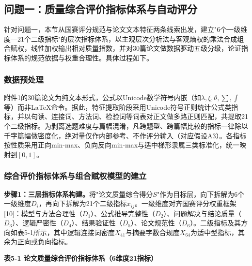 \documentclass[withoutpreface]{cumcmthesis}
\begin{document}
\subsection{问题一：质量综合评价指标体系与自动评分}
针对问题一，本节从国赛评分规范与论文文本特征两条线索出发，建立"6个一级维度—21个二级指标"的层次指标体系，以主观层次分析法与客观熵权的乘法合成组合赋权，线性加权输出相对质量指数，并对30篇论文做数据驱动五级分级，论证指标体系的规范依据与权重合理性。具体过程如下。

\subsubsection{数据预处理}
附件1的30篇论文为纯文本形式，公式以Unicode数学符号内嵌（如$\lambda,\xi,\theta,\sum,\int$等）而非LaTeX命令。据此，特征提取阶段采用Unicode符号正则统计公式类指标，并以句读、连接词、方法词、检验词等词表对正文做多路正则匹配，共提取21个二级指标。为剥离选题难度与篇幅混淆，凡跨题型、跨篇幅比较的指标一律除以千字篇幅做密度化，绝对量仅作内部参考、不作评分输入（对应假设A3）。各指标按性质采用正向min-max、负向反向min-max与适中梯形隶属三类标准化，统一映射到$[0,1]$。

\subsubsection{综合评价指标体系与组合赋权模型的建立}
\textbf{步骤1：三层指标体系构建。}将"论文质量综合得分$S$"作为目标层，向下拆解为6个一级维度$D_i$，再向下拆解为21个二级指标$x_{ij}$。一级维度对齐国赛评分权重框架[10]：模型与方法合理性（$D_1$）、公式推导完整性（$D_2$）、问题解决与结论质量（$D_3$）、逻辑严密性（$D_4$）、结果验证性（$D_5$）、论文规范性（$D_6$）。二级指标及其方向如表5-1所示，其中逻辑连接词密度$X_{41}$与摘要字数合规度$X_{64}$为适中型指标，其余为正向或负向指标。

\textbf{表5-1 论文质量综合评价指标体系（6维度21指标）}
\end{document}
